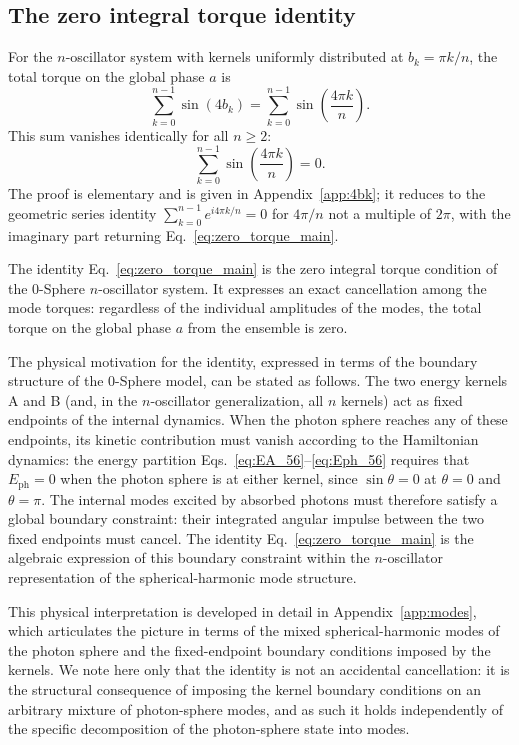 \documentclass[%
 reprint, amsmath,amssymb, aps, prb, ]{revtex4-2}
\numberwithin{equation}{section}
\newcommand{\EphS}{E_{\text{ph}}}
\begin{document}
\subsection{The zero integral torque identity}
\label{sec:zerotorque_identity}

For the $n$-oscillator system with kernels uniformly distributed at $b_k = \pi k/n$, the total torque on the global phase $a$ is
\begin{equation}
\sum_{k=0}^{n-1}\sin(4b_k) = \sum_{k=0}^{n-1}\sin\!\left(\frac{4\pi k}{n}\right).
\label{eq:zero_torque_sum}
\end{equation}
This sum vanishes identically for all $n \geq 2$:
\begin{equation}
\sum_{k=0}^{n-1}\sin\!\left(\frac{4\pi k}{n}\right) = 0.
\label{eq:zero_torque_main}
\end{equation}
The proof is elementary and is given in Appendix~\ref{app:4bk}; it reduces to the geometric series identity $\sum_{k=0}^{n-1} e^{i 4\pi k/n} = 0$ for $4\pi/n$ not a multiple of $2\pi$, with the imaginary part returning Eq.~\eqref{eq:zero_torque_main}.

The identity Eq.~\eqref{eq:zero_torque_main} is the zero integral torque condition of the 0-Sphere $n$-oscillator system. It expresses an exact cancellation among the mode torques: regardless of the individual amplitudes of the modes, the total torque on the global phase $a$ from the ensemble is zero.

The physical motivation for the identity, expressed in terms of the boundary structure of the 0-Sphere model, can be stated as follows. The two energy kernels A and B (and, in the $n$-oscillator generalization, all $n$ kernels) act as fixed endpoints of the internal dynamics. When the photon sphere reaches any of these endpoints, its kinetic contribution must vanish according to the Hamiltonian dynamics: the energy partition Eqs.~\eqref{eq:EA_56}--\eqref{eq:Eph_56} requires that $\EphS = 0$ when the photon sphere is at either kernel, since $\sin\theta = 0$ at $\theta = 0$ and $\theta = \pi$. The internal modes excited by absorbed photons must therefore satisfy a global boundary constraint: their integrated angular impulse between the two fixed endpoints must cancel. The identity Eq.~\eqref{eq:zero_torque_main} is the algebraic expression of this boundary constraint within the $n$-oscillator representation of the spherical-harmonic mode structure.

This physical interpretation is developed in detail in Appendix~\ref{app:modes}, which articulates the picture in terms of the mixed spherical-harmonic modes of the photon sphere and the fixed-endpoint boundary conditions imposed by the kernels. We note here only that the identity is not an accidental cancellation: it is the structural consequence of imposing the kernel boundary conditions on an arbitrary mixture of photon-sphere modes, and as such it holds independently of the specific decomposition of the photon-sphere state into modes.
\end{document}
